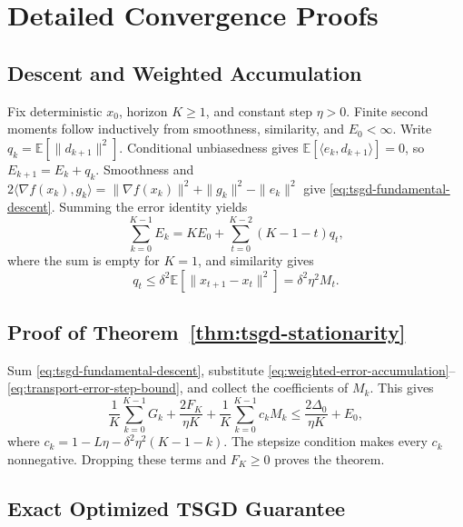 \section{Detailed Convergence Proofs}
\label{app:convergence-proofs}

\subsection{Descent and Weighted Accumulation}
\label{subsec:descent-and-accumulation}

Fix deterministic $x_0$, horizon $K\geq1$, and constant step $\eta>0$.
Finite second moments follow inductively from smoothness, similarity,
and $E_0<\infty$. Write $q_k=\mathbb E[\|d_{k+1}\|^2]$.
Conditional unbiasedness gives
$\mathbb E[\langle e_k,d_{k+1}\rangle]=0$, so $E_{k+1}=E_k+q_k$.
Smoothness and
$2\langle\nabla f(x_k),g_k\rangle
=\|\nabla f(x_k)\|^2+\|g_k\|^2-\|e_k\|^2$
give \eqref{eq:tsgd-fundamental-descent}. Summing the error identity yields
\begin{equation}
\label{eq:weighted-error-accumulation}
\sum_{k=0}^{K-1}E_k
=KE_0+\sum_{t=0}^{K-2}(K-1-t)q_t,
\end{equation}
where the sum is empty for $K=1$, and similarity gives
\begin{equation}
\label{eq:transport-error-step-bound}
q_t\leq\delta^2\mathbb E[\|x_{t+1}-x_t\|^2]=\delta^2\eta^2M_t.
\end{equation}

\subsection{Proof of Theorem~\ref{thm:tsgd-stationarity}}

Sum \eqref{eq:tsgd-fundamental-descent}, substitute
\eqref{eq:weighted-error-accumulation}--\eqref{eq:transport-error-step-bound},
and collect the coefficients of $M_k$. This gives
\begin{equation}
\label{eq:tsgd-full-bound}
\frac1K\sum_{k=0}^{K-1}G_k+\frac{2F_K}{\eta K}
+\frac1K\sum_{k=0}^{K-1}c_kM_k
\leq\frac{2\Delta_0}{\eta K}+E_0,
\end{equation}
where $c_k=1-L\eta-\delta^2\eta^2(K-1-k)$.
The stepsize condition makes every $c_k$ nonnegative. Dropping
these terms and $F_K\geq0$ proves the theorem.

\subsection{Exact Optimized TSGD Guarantee}
\label{subsec:optimized-tsgd-guarantees}

